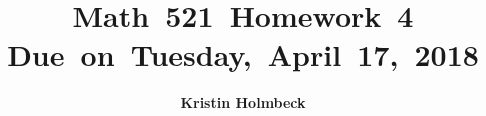 


\newcommand{\hmwkTitle}{Homework\ 4} %
\newcommand{\hmwkDueDate}{Tuesday,\ April\ 17,\ 2018} %
\newcommand{\hmwkClass}{Math\ 521} %
\newcommand{\hmwkAuthorName}{Kristin Holmbeck} %


\title{
\textmd{\textbf{\hmwkClass \ \hmwkTitle}}\\
\normalsize\vspace{0.1in}\small{Due\ on\ \hmwkDueDate}\\
\vspace{0.1in}
\vspace{0.2in}
}

\author{\textbf{\hmwkAuthorName}}
\date{} %




\maketitle


\vspace{0.75in}
\tableofcontents
\listoffigures
\newpage



